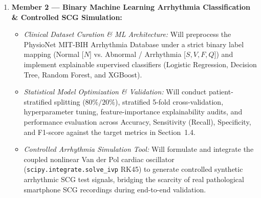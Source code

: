 \begin{enumerate}
	\item \textbf{Member 2 --- Binary Machine Learning Arrhythmia Classification \& Controlled SCG Simulation:}
	\begin{itemize}
		\item \textit{Clinical Dataset Curation \& ML Architecture:} Will preprocess the PhysioNet MIT-BIH Arrhythmia Database under a strict binary label mapping (Normal [$N$] vs. Abnormal / Arrhythmia [$S, V, F, Q$]) and implement explainable supervised classifiers (Logistic Regression, Decision Tree, Random Forest, and XGBoost).
		\item \textit{Statistical Model Optimization \& Validation:} Will conduct patient-stratified splitting ($80\%/20\%$), stratified 5-fold cross-validation, hyperparameter tuning, feature-importance explainability audits, and performance evaluation across Accuracy, Sensitivity (Recall), Specificity, and F1-score against the target metrics in Section~1.4.
		\item \textit{Controlled Arrhythmia Simulation Tool:} Will formulate and integrate the coupled nonlinear Van der Pol cardiac oscillator (\texttt{scipy.integrate.solve\_ivp} RK45) to generate controlled synthetic arrhythmic SCG test signals, bridging the scarcity of real pathological smartphone SCG recordings during end-to-end validation.
	\end{itemize}
\end{enumerate}